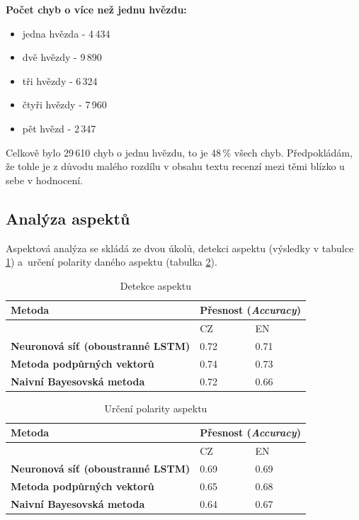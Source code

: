 \textbf{Počet chyb o více než jednu hvězdu:}
\begin{itemize}
    \item jedna hvězda - 4\,434
    \item dvě hvězdy - 9\,890
    \item tři hvězdy - 6\,324
    \item čtyři hvězdy - 7\,960
    \item pět hvězd - 2\,347
\end{itemize}

Celkově bylo 29\,610 chyb o jednu hvězdu, to je 48\,\% všech chyb. Předpokládám, že tohle je z důvodu malého rozdílu v obsahu textu recenzí mezi těmi blízko u sebe v hodnocení.

\FloatBarrier

\subsection{Analýza aspektů}
Aspektová analýza se skládá ze dvou úkolů, detekci aspektu (výsledky v tabulce \ref{tab:table1.6}) a~určení polarity daného aspektu (tabulka \ref{tab:table1.7}).
\FloatBarrier
\begin{table}[h!]
  \begin{center}
    \caption{Detekce aspektu}
    \label{tab:table1.6}
    \begin{tabular}{l|l|l}
      \textbf{Metoda} &  \multicolumn{2}{l}{\textbf{Přesnost (\emph{Accuracy})}}\\ 
      \hline
      \textbf & CZ & EN \\ 
      \textbf{Neuronová síť (oboustranné LSTM)} & 0.72 & 0.71  \\ 
      \textbf{Metoda podpůrných vektorů} & 0.74 & 0.73 \\ 
      \textbf{Naivní Bayesovská metoda} & 0.72 & 0.66 \\ 
     \end{tabular}
  \end{center}
\end{table}
\FloatBarrier


\begin{table}[h!]
  \begin{center}
    \caption{Určení polarity aspektu}
    \label{tab:table1.7}
    \begin{tabular}{l|l|l}
      \textbf{Metoda} &  \multicolumn{2}{l}{\textbf{Přesnost (\emph{Accuracy})}}\\ %
      \hline
      \textbf & CZ & EN \\ 
      \textbf{Neuronová síť (oboustranné LSTM)} & 0.69 & 0.69  \\ 
      \textbf{Metoda podpůrných vektorů} & 0.65 & 0.68 \\ 
      \textbf{Naivní Bayesovská metoda} & 0.64 & 0.67 \\ 
     \end{tabular}
  \end{center}
\end{table}
\FloatBarrier

